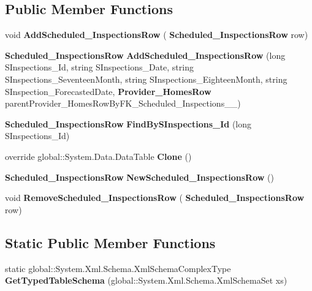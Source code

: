 \subsection*{Public Member Functions}
\begin{DoxyCompactItemize}
\item 
\mbox{\label{class_a_f_h___scheduler_1_1_home_inspection_data_set_1_1_scheduled___inspections_data_table_a21164be985daa58c5b6ce5f4b47093b4}} 
void {\bfseries Add\+Scheduled\+\_\+\+Inspections\+Row} (\textbf{ Scheduled\+\_\+\+Inspections\+Row} row)
\item 
\mbox{\label{class_a_f_h___scheduler_1_1_home_inspection_data_set_1_1_scheduled___inspections_data_table_a28dbf712049e7d2492560ccb06bd65f8}} 
\textbf{ Scheduled\+\_\+\+Inspections\+Row} {\bfseries Add\+Scheduled\+\_\+\+Inspections\+Row} (long S\+Inspections\+\_\+\+Id, string S\+Inspections\+\_\+\+Date, string S\+Inspections\+\_\+\+Seventeen\+Month, string S\+Inspections\+\_\+\+Eighteen\+Month, string S\+Inspection\+\_\+\+Forecasted\+Date, \textbf{ Provider\+\_\+\+Homes\+Row} parent\+Provider\+\_\+\+Homes\+Row\+By\+F\+K\+\_\+\+Scheduled\+\_\+\+Inspections\+\_\+\_)
\item 
\mbox{\label{class_a_f_h___scheduler_1_1_home_inspection_data_set_1_1_scheduled___inspections_data_table_a6f6e4cec49ff84d1b44fdb7695f2eb41}} 
\textbf{ Scheduled\+\_\+\+Inspections\+Row} {\bfseries Find\+By\+S\+Inspections\+\_\+\+Id} (long S\+Inspections\+\_\+\+Id)
\item 
\mbox{\label{class_a_f_h___scheduler_1_1_home_inspection_data_set_1_1_scheduled___inspections_data_table_a7fd0c5bf38ff2ddd87e653f031cc1c8b}} 
override global\+::\+System.\+Data.\+Data\+Table {\bfseries Clone} ()
\item 
\mbox{\label{class_a_f_h___scheduler_1_1_home_inspection_data_set_1_1_scheduled___inspections_data_table_a77642840a1bafb8c40370c849df0e9ec}} 
\textbf{ Scheduled\+\_\+\+Inspections\+Row} {\bfseries New\+Scheduled\+\_\+\+Inspections\+Row} ()
\item 
\mbox{\label{class_a_f_h___scheduler_1_1_home_inspection_data_set_1_1_scheduled___inspections_data_table_a171da1c20a9b49e444d375e49883a113}} 
void {\bfseries Remove\+Scheduled\+\_\+\+Inspections\+Row} (\textbf{ Scheduled\+\_\+\+Inspections\+Row} row)
\end{DoxyCompactItemize}
\subsection*{Static Public Member Functions}
\begin{DoxyCompactItemize}
\item 
\mbox{\label{class_a_f_h___scheduler_1_1_home_inspection_data_set_1_1_scheduled___inspections_data_table_a8759e99ca0d0bd3e3d159032d108807e}} 
static global\+::\+System.\+Xml.\+Schema.\+Xml\+Schema\+Complex\+Type {\bfseries Get\+Typed\+Table\+Schema} (global\+::\+System.\+Xml.\+Schema.\+Xml\+Schema\+Set xs)
\end{DoxyCompactItemize}
